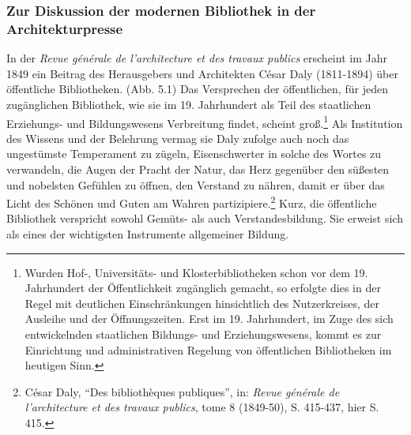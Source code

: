 \subsubsection{Zur Diskussion der modernen Bibliothek in der
Architekturpresse}\label{zur-diskussion-der-modernen-bibliothek-in-der-architekturpresse}

In der \emph{Revue générale de l'architecture et des travaux publics}
erscheint im Jahr 1849 ein Beitrag des Herausgebers und Architekten
César Daly (1811-1894) über öffentliche Bibliotheken. (Abb. 5.1) Das
Versprechen der öffentlichen, für jeden zugänglichen Bibliothek, wie sie
im 19. Jahrhundert als Teil des staatlichen Erziehungs- und
Bildungswesens Verbreitung findet, scheint groß.\footnote{Wurden Hof-,
  Universitäts- und Klosterbibliotheken schon vor dem 19. Jahrhundert
  der Öffentlichkeit zugänglich gemacht, so erfolgte dies in der Regel
  mit deutlichen Einschränkungen hinsichtlich des Nutzerkreises, der
  Ausleihe und der Öffnungszeiten. Erst im 19. Jahrhundert, im Zuge des
  sich entwickelnden staatlichen Bildungs- und Erziehungswesens, kommt
  es zur Einrichtung und administrativen Regelung von öffentlichen
  Bibliotheken im heutigen Sinn.} Als Institution des Wissens und der
Belehrung vermag sie Daly zufolge auch noch das ungestümste Temperament
zu zügeln, Eisenschwerter in solche des Wortes zu verwandeln, die Augen
der Pracht der Natur, das Herz gegenüber den süßesten und nobelsten
Gefühlen zu öffnen, den Verstand zu nähren, damit er über das Licht des
Schönen und Guten am Wahren partizipiere.\footnote{César Daly,
  \enquote{Des bibliothèques publiques}, in: \emph{Revue générale de
  l'architecture et des travaux publics}, tome 8 (1849-50), S. 415-437,
  hier S. 415.} Kurz, die öffentliche Bibliothek verspricht sowohl
Gemüts- als auch Verstandesbildung. Sie erweist sich als eines der
wichtigsten Instrumente allgemeiner Bildung.

